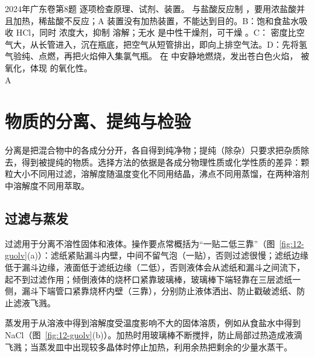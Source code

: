 \begin{zhenti}{2024年广东卷第8题}
\tcblower
\silu 逐项检查原理、试剂、装置。 与盐酸反应制 ，要用浓盐酸并且加热，稀盐酸不反应；A 装置没有加热装置，不能达到目的。B：饱和食盐水吸收 HCl，同时  浓度大，抑制  溶解；无水  是中性干燥剂，可干燥 。C： 密度比空气大，从长管进入，沉在瓶底，把空气从短管排出，即向上排空气法。D：先将氢气验纯、点燃，再把火焰伸入集氯气瓶。 在  中安静地燃烧，发出苍白色火焰， 被氧化，体现  的氧化性。\\
\daan A
\end{zhenti}

\section{物质的分离、提纯与检验}

分离是把混合物中的各成分分开，各自得到纯净物；提纯（除杂）只要求把杂质除去，得到被提纯的物质。选择方法的依据是各成分物理性质或化学性质的差异：颗粒大小不同用过滤，溶解度随温度变化不同用结晶，沸点不同用蒸馏，在两种溶剂中溶解度不同用萃取。

\subsection{过滤与蒸发}

过滤用于分离不溶性固体和液体。操作要点常概括为“一贴二低三靠”（图~\ref{fig:12-guolv}(a)）：滤纸紧贴漏斗内壁，中间不留气泡（一贴），否则过滤很慢；滤纸边缘低于漏斗边缘，液面低于滤纸边缘（二低），否则液体会从滤纸和漏斗之间流下，起不到过滤作用；倾倒液体的烧杯口紧靠玻璃棒，玻璃棒下端轻靠在三层滤纸一侧，漏斗下端管口紧靠烧杯内壁（三靠），分别防止液体洒出、防止戳破滤纸、防止滤液飞溅。

蒸发用于从溶液中得到溶解度受温度影响不大的固体溶质，例如从食盐水中得到 NaCl（图~\ref{fig:12-guolv}(b)）。加热时用玻璃棒不断搅拌，防止局部过热造成液滴飞溅；当蒸发皿中出现较多晶体时停止加热，利用余热把剩余的少量水蒸干。

